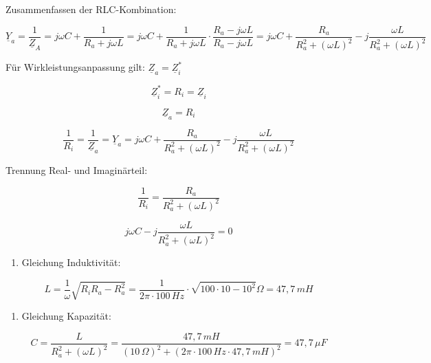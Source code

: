 \documentclass[
  ngerman,
  letterpaper,
]{scrbook}
\providecommand{\tightlist}{%
  \setlength{\itemsep}{0pt}\setlength{\parskip}{0pt}}
\begin{document}
\begin{tcolorbox}[enhanced jigsaw, titlerule=0mm, rightrule=.15mm, toprule=.15mm, colback=white, toptitle=1mm, bottomrule=.15mm, coltitle=black, leftrule=.75mm, arc=.35mm, colbacktitle=quarto-callout-caution-color!10!white, opacityback=0, bottomtitle=1mm, colframe=quarto-callout-caution-color-frame, opacitybacktitle=0.6, breakable, title=\textcolor{quarto-callout-caution-color}{\faFire}\hspace{0.5em}{Lösung 7.3}, left=2mm]

Zusammenfassen der RLC-Kombination:

\[\underline{Y}_a = \frac{1}{\underline{Z}_A} = j \omega C + \frac{1}{R_a + j \omega L} = j \omega C + \frac{1}{R_a + j\omega L} \cdot \frac{R_a - j\omega L}{R_a - j\omega L} = j\omega C + \frac{R_a}{R_a^2 + (\omega L)^2} - j \frac{\omega L}{R_a^2 + (\omega L)^2}\]

Für Wirkleistungsanpassung gilt: \(\underline{Z}_a = \underline{Z}_i^*\)

\[\underline{Z}_i^* = R_i = \underline{Z}_i\]

\[\underline{Z}_a = R_i\]

\[\frac{1}{R_i} = \frac{1}{\underline{Z}_a} = \underline{Y}_a = j\omega C + \frac{R_a}{R_a^2 + (\omega L)^2} - j \frac{\omega L}{R_a^2 + (\omega L)^2}\]

Trennung Real- und Imaginärteil:

\[\frac{1}{R_i} = \frac{R_a}{R_a^2 + (\omega L)^2}\]

\[j \omega C - j \frac{\omega L}{R_a^2 + (\omega L)^2} = 0\]

\begin{enumerate}
\def\labelenumi{\arabic{enumi}.}
\tightlist
\item
  Gleichung Induktivität:
\end{enumerate}

\[L = \frac{1}{\omega} \sqrt{R_i R_a - R_a^2} = \frac{1}{2\pi \cdot 100\,Hz} \cdot \sqrt{100 \cdot 10 - 10^2}\Omega = 47,7\,mH\]

\begin{enumerate}
\def\labelenumi{\arabic{enumi}.}
\setcounter{enumi}{1}
\tightlist
\item
  Gleichung Kapazität:
\end{enumerate}

\[C = \frac{L}{R_a^2 + (\omega L)^2} = \frac{47,7\,mH}{(10\,\Omega)^2 + (2\pi \cdot 100\,Hz \cdot 47,7\,mH)^2} = 47,7\,\mu F\]

\end{tcolorbox}
\end{document}
